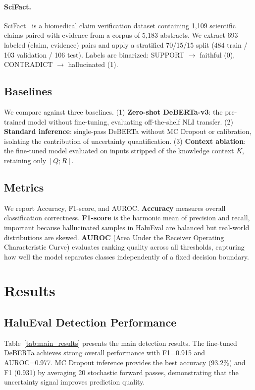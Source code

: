\documentclass[11pt]{article}
\begin{document}
\paragraph{SciFact.} SciFact~\citep{wadden2020fact} is a biomedical claim verification dataset containing 1,109 scientific claims paired with evidence from a corpus of 5,183 abstracts. We extract 693 labeled (claim, evidence) pairs and apply a stratified 70/15/15 split (484 train / 103 validation / 106 test). Labels are binarized: SUPPORT $\rightarrow$ faithful (0), CONTRADICT $\rightarrow$ hallucinated (1).

\subsection{Baselines}

We compare against three baselines. (1) \textbf{Zero-shot DeBERTa-v3}: the pre-trained model without fine-tuning, evaluating off-the-shelf NLI transfer. (2) \textbf{Standard inference}: single-pass DeBERTa without MC Dropout or calibration, isolating the contribution of uncertainty quantification. (3) \textbf{Context ablation}: the fine-tuned model evaluated on inputs stripped of the knowledge context $K$, retaining only $[Q; R]$.

\subsection{Metrics}

We report Accuracy, F1-score, and AUROC. \textbf{Accuracy} measures overall classification correctness. \textbf{F1-score} is the harmonic mean of precision and recall, important because hallucinated samples in HaluEval are balanced but real-world distributions are skewed. \textbf{AUROC} (Area Under the Receiver Operating Characteristic Curve) evaluates ranking quality across all thresholds, capturing how well the model separates classes independently of a fixed decision boundary.


\section{Results}

\subsection{HaluEval Detection Performance}

Table~\ref{tab:main_results} presents the main detection results. The fine-tuned DeBERTa achieves strong overall performance with F1=0.915 and AUROC=0.977. MC Dropout inference provides the best accuracy (93.2\%) and F1 (0.931) by averaging 20 stochastic forward passes, demonstrating that the uncertainty signal improves prediction quality.
\end{document}
